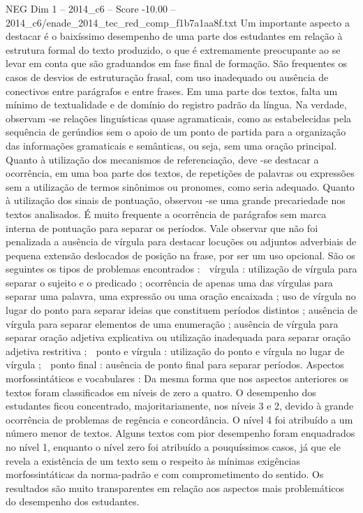 \begin{textsample}{NEG Dim 1 – 2014\_c6 – Score -10.00 – 2014\_c6/enade\_2014\_tec\_red\_comp\_f1b7a1aa8f.txt}
Um importante aspecto a destacar é o baixíssimo desempenho de uma parte dos estudantes em relação à estrutura formal do texto produzido, o que é extremamente preocupante ao se levar em conta que são graduandos em fase final de formação.
São frequentes os casos de desvios de estruturação frasal, com uso inadequado ou ausência de conectivos entre parágrafos e entre frases.
Em uma parte dos textos, falta um mínimo de textualidade e de domínio do registro padrão da língua.
Na verdade, observam -se relações linguísticas quase agramaticais, como as estabelecidas pela sequência de gerúndios sem o apoio de um ponto de partida para a organização das informações gramaticais e semânticas, ou seja, sem uma oração principal.
Quanto à utilização dos mecanismos de referenciação, deve -se destacar a ocorrência, em uma boa parte dos textos, de repetições de palavras ou expressões sem a utilização de termos sinônimos ou pronomes, como seria adequado.
Quanto à utilização dos sinais de pontuação, observou -se uma grande precariedade nos textos analisados.
É muito frequente a ocorrência de parágrafos sem marca interna de pontuação para separar os períodos.
Vale observar que não foi penalizada a ausência de vírgula para destacar locuções ou adjuntos adverbiais de pequena extensão deslocados de posição na frase, por ser um uso opcional.
São os seguintes os tipos de problemas encontrados :  vírgula : utilização de vírgula para separar o sujeito e o predicado ; ocorrência de apenas uma das vírgulas para separar uma palavra, uma expressão ou uma oração encaixada ; uso de vírgula no lugar do ponto para separar ideias que constituem períodos distintos ; ausência de vírgula para separar elementos de uma enumeração ; ausência de vírgula para separar oração adjetiva explicativa ou utilização inadequada para separar oração adjetiva restritiva ;  ponto e vírgula : utilização do ponto e vírgula no lugar de vírgula ;  ponto final : ausência de ponto final para separar períodos.
Aspectos morfossintáticos e vocabulares : Da mesma forma que nos aspectos anteriores os textos foram classificados em níveis de zero a quatro.
O desempenho dos estudantes ficou concentrado, majoritariamente, nos níveis 3 e 2, devido à grande ocorrência de problemas de regência e concordância.
O nível 4 foi atribuído a um número menor de textos.
Alguns textos com pior desempenho foram enquadrados no nível 1, enquanto o nível zero foi atribuído a pouquíssimos casos, já que ele revela a existência de um texto sem o respeito às mínimas exigências morfossintáticas da norma-padrão e com comprometimento do sentido.
Os resultados são muito transparentes em relação aos aspectos mais problemáticos do desempenho dos estudantes.

\end{textsample}
